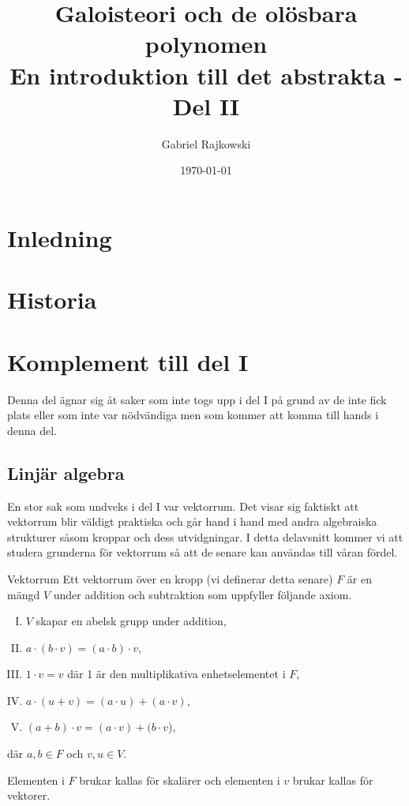 \documentclass{article}
\theoremstyle{definition}
\begin{document}
\title{%
  Galoisteori och de olösbara polynomen \\
  \small{En introduktion till det abstrakta - Del II}
}
\author{Gabriel Rajkowski}
\date{\today}

\maketitle

\thispagestyle{empty}

\clearpage
\tableofcontents
\section{Inledning}
\section{Historia}
\section{Komplement till del I}
Denna del ägnar sig åt saker som inte togs upp i del I på grund av de inte fick plats eller som inte var nödvändiga men som kommer att komma 
till hands i denna del.

\subsection{Linjär algebra}
En stor sak som undveks i del I var vektorrum. Det visar sig faktiskt att vektorrum blir väldigt praktiska och går hand i hand med andra 
algebraiska strukturer såsom kroppar och dess utvidgningar. I detta delavsnitt kommer vi att studera grunderna för vektorrum så att de senare kan användas till 
våran fördel.

\begin{mydef}{Vektorrum}{}
  Ett vektorrum över en kropp (vi definerar detta senare) $F$ är en mängd $V$ under addition och subtraktion som uppfyller följande axiom.
  \begin{enumerate}[I)]
    \item $V$ skapar en abelsk grupp under addition,
    \item $a \cdot (b \cdot v) = (a \cdot b) \cdot v$,
    \item $1 \cdot v = v$ där 1 är den multiplikativa enhetselementet i $F$,
    \item $a \cdot (u + v) = (a \cdot u) + (a \cdot v)$,
    \item $(a + b) \cdot v = (a \cdot v) + (b \cdot v$),
  \end{enumerate}
  där $a, b \in F$ och $v, u \in V$.
\end{mydef}
Elementen i $F$ brukar kallas för skalärer och elementen i $v$ 
brukar kallas för vektorer. 
\end{document}
